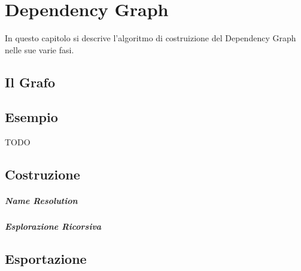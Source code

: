 \chapter{Dependency Graph}

In questo capitolo si descrive l'algoritmo di costruizione del Dependency Graph nelle sue varie fasi.

\section{Il Grafo}

\section{Esempio}
TODO

\section{Costruzione}

\paragraph{Name Resolution}

\paragraph{Esplorazione Ricorsiva}

\section{Esportazione}
